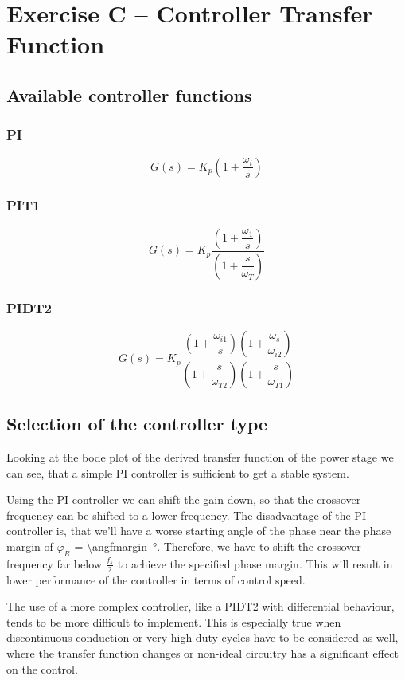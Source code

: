 \section{Exercise C -- Controller Transfer Function}

\subsection{Available controller functions}

\subsubsection{PI}
\[
	G(s)
	= K_p \left(1 + \dfrac{\omega_i}{s} \right)
\]

\subsubsection{PIT1}
\[
	G(s)
	= K_p \dfrac{
		\left(1 + \dfrac{\omega_{1}}{s}\right)
	}{ 
		\left(1 + \dfrac{s}{\omega_{T}} \right)
	}
\]
\subsubsection{PIDT2}

\[
	G(s)
	= K_p \dfrac{
		\left(1 + \dfrac{\omega_{i1}}{s}\right) \left(1 + \dfrac{\omega_{s}}{\omega_{i2}}\right)
	}{ 
		\left(1 + \dfrac{s}{\omega_{T2}} \right) \left(1 + \dfrac{s}{\omega_{T1}} \right)
	}
\]

\subsection{Selection of the controller type}
Looking at the bode plot of the derived transfer function of the power stage
we can see, that a simple PI controller is sufficient to get a stable system.

Using the PI controller we can shift the gain down, so that the crossover
frequency can be shifted to a lower frequency. The disadvantage of the PI
controller is, that we'll have a worse starting angle of the phase near the
phase margin of $\varphi_R$ = \SI{\angfmargin}{\degree}. Therefore, we have to
shift the crossover frequency far below $\frac{f_s}{2}$ to achieve the specified
phase margin. This will result in lower performance of the controller in terms of
control speed.

The use of a more complex controller, like a PIDT2 with differential behaviour,
tends to be more difficult to implement. This is especially true when 
discontinuous conduction or very high duty cycles have to be considered as well,
where the transfer function changes or non-ideal circuitry has a significant
effect on the control.

